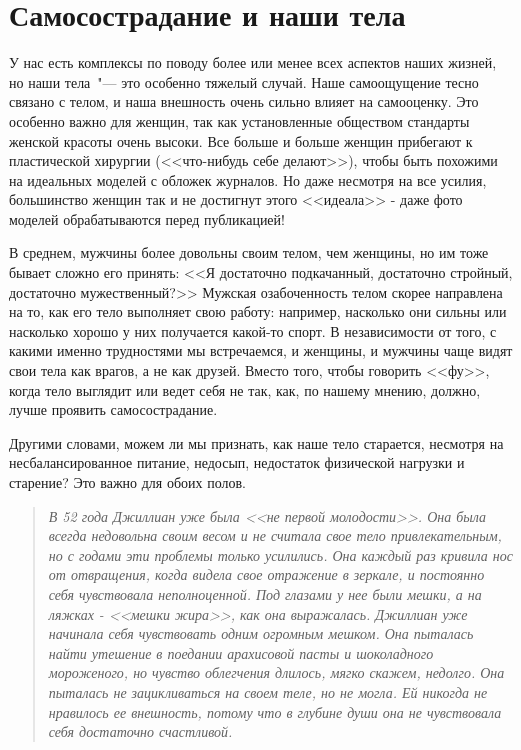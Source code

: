 
\chapter{Самосострадание и наши тела} \label{Self-Compassion_and_Our_Bodies}

У нас есть комплексы по поводу более или менее всех аспектов наших жизней, но наши тела~"--- это особенно тяжелый случай. Наше самоощущение тесно связано с телом, и наша внешность очень сильно влияет на самооценку. Это особенно важно для женщин, так как установленные обществом стандарты женской красоты очень высоки. Все больше и больше женщин прибегают к пластической хирургии (<<что-нибудь себе делают>>), чтобы быть похожими на идеальных моделей с обложек журналов. Но даже несмотря на все усилия, большинство женщин так и не достигнут этого <<идеала>> - даже фото моделей обрабатываются перед публикацией!

В среднем, мужчины более довольны своим телом, чем женщины, но им тоже бывает сложно его принять: <<Я достаточно подкачанный, достаточно стройный, достаточно мужественный?>> Мужская озабоченность телом скорее направлена на то, как его тело выполняет свою работу: например, насколько они сильны или насколько хорошо у них получается какой-то спорт. В независимости от того, с какими именно трудностями мы встречаемся, и женщины, и мужчины чаще видят свои тела как врагов, а не как друзей. Вместо того, чтобы говорить <<фу>>, когда тело выглядит или ведет себя не так, как, по нашему мнению, должно, лучше проявить самосострадание. 

Другими словами, можем ли мы признать, как наше тело старается, несмотря на несбалансированное питание, недосып, недостаток физической нагрузки и старение? Это важно для обоих полов. 

\begin{quotation}
	\textit{
		В 52 года Джиллиан уже была <<не первой молодости>>. Она была всегда недовольна своим весом и не считала свое тело привлекательным, но с годами эти проблемы только усилились. Она каждый раз кривила нос от отвращения, когда видела свое отражение в зеркале, и постоянно себя чувствовала неполноценной. Под глазами у нее были мешки, а на ляжках - <<мешки жира>>, как она выражалась. Джиллиан уже начинала себя чувствовать одним огромным мешком. Она пыталась найти утешение в поедании арахисовой пасты и шоколадного мороженого, но чувство облегчения длилось, мягко скажем, недолго. Она пыталась не зацикливаться на своем теле, но не могла. Ей никогда не нравилось ее внешность, потому что в глубине души она не чувствовала себя достаточно счастливой.
	}
\end{quotation}

